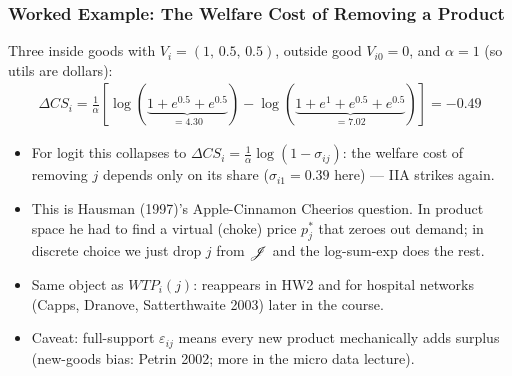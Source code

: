 \documentclass[aspectratio=169,11pt]{beamer}
\begin{document}
\begin{frame}
\frametitle{Worked Example: The Welfare Cost of Removing a Product}
Three inside goods with $V_i = (1,\, 0.5,\, 0.5)$, outside good $V_{i0}=0$, and $\alpha = 1$ (so utils are dollars):
\begin{eqnarray*}
\Delta CS_i = \frac{1}{\alpha}\left[\log (\underbrace{1 + e^{0.5} + e^{0.5}}_{= 4.30}) - \log (\underbrace{1 + e^{1} + e^{0.5}+ e^{0.5}}_{= 7.02}) \right] = -0.49
\end{eqnarray*}
\begin{itemize}
\item For logit this collapses to $\Delta CS_i = \frac{1}{\alpha} \log(1-\sigma_{ij})$: the welfare cost of removing $j$ depends \alert{only on its share} ($\sigma_{i1} = 0.39$ here) --- IIA strikes again.
\item This is Hausman (1997)'s Apple-Cinnamon Cheerios question. In product space he had to find a \alert{virtual (choke) price} $p_j^{*}$ that zeroes out demand; in discrete choice we just drop $j$ from $\mathscr{J}$ and the log-sum-exp does the rest.
\item Same object as $WTP_i(j)$: reappears in HW2 and for hospital networks (Capps, Dranove, Satterthwaite 2003) later in the course.
\item Caveat: full-support $\varepsilon_{ij}$ means \alert{every} new product mechanically adds surplus (new-goods bias: Petrin 2002; more in the micro data lecture).
\end{itemize}
\end{frame}
\end{document}
